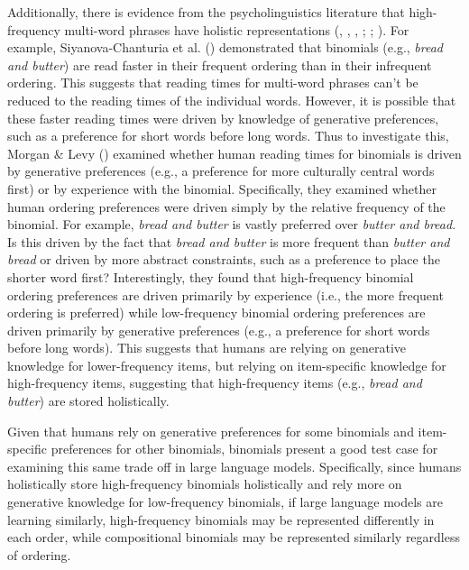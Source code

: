 \documentclass[
  12pt,
  letterpaper,
]{scrreprt}
\begin{document}
Additionally, there is evidence from the psycholinguistics literature
that high-frequency multi-word phrases have holistic representations
(,
,
,
;
;
). For example, Siyanova-Chanturia et al.
()
demonstrated that binomials (e.g., \emph{bread and butter}) are read
faster in their frequent ordering than in their infrequent ordering.
This suggests that reading times for multi-word phrases can't be reduced
to the reading times of the individual words. However, it is possible
that these faster reading times were driven by knowledge of generative
preferences, such as a preference for short words before long words.
Thus to investigate this, Morgan \& Levy
() examined
whether human reading times for binomials is driven by generative
preferences (e.g., a preference for more culturally central words first)
or by experience with the binomial. Specifically, they examined whether
human ordering preferences were driven simply by the relative frequency
of the binomial. For example, \emph{bread and butter} is vastly
preferred over \emph{butter and bread}. Is this driven by the fact that
\emph{bread and butter} is more frequent than \emph{butter and bread} or
driven by more abstract constraints, such as a preference to place the
shorter word first? Interestingly, they found that high-frequency
binomial ordering preferences are driven primarily by experience (i.e.,
the more frequent ordering is preferred) while low-frequency binomial
ordering preferences are driven primarily by generative preferences
(e.g., a preference for short words before long words). This suggests
that humans are relying on generative knowledge for lower-frequency
items, but relying on item-specific knowledge for high-frequency items,
suggesting that high-frequency items (e.g., \emph{bread and butter}) are
stored holistically.

Given that humans rely on generative preferences for some binomials and
item-specific preferences for other binomials, binomials present a good
test case for examining this same trade off in large language models.
Specifically, since humans holistically store high-frequency binomials
holistically and rely more on generative knowledge for low-frequency
binomials, if large language models are learning similarly,
high-frequency binomials may be represented differently in each order,
while compositional binomials may be represented similarly regardless of
ordering.
\end{document}
